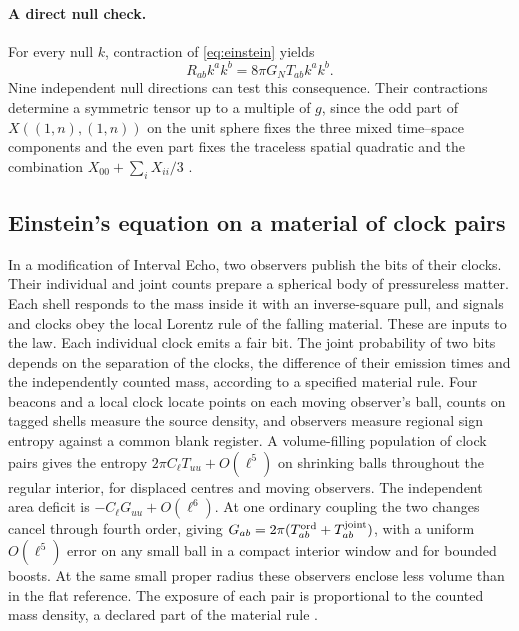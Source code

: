 \documentclass[11pt]{article}
\theoremstyle{definition}
\theoremstyle{remark}
\begin{document}
\paragraph{A direct null check.}
\label{thm:null-tomography}
For every null $k$, contraction of \eqref{eq:einstein} yields
\begin{equation}
 R_{ab}k^ak^b=8\pi G_N T_{ab}k^ak^b . \label{eq:null-balance}
\end{equation}
Nine independent null directions can test this consequence. Their
contractions determine a symmetric tensor up to a multiple of $g$, since
the odd part of $X((1,n),(1,n))$ on the unit sphere fixes the three mixed
time--space components and the even part fixes the traceless spatial
quadratic and the combination $X_{00}+\sum_i X_{ii}/3$ \cite{ophEinstein}.

\subsection{Einstein's equation on a material of clock pairs}
\label{sec:einstein-dust}

In a modification of Interval Echo, two observers publish the bits of
their clocks. Their individual and joint counts prepare a spherical body
of pressureless matter. Each shell responds to the mass inside it with
an inverse-square pull, and signals and clocks obey the local Lorentz
rule of the falling material. These are inputs to the law. Each
individual clock emits a fair bit. The joint probability of two bits
depends on the separation of the clocks, the difference of their
emission times and the independently counted mass, according to a
specified material rule. Four beacons and a local clock locate points on
each moving observer's ball, counts on tagged shells measure the source
density, and observers measure regional sign entropy against a common
blank register. A volume-filling population of clock pairs gives the
entropy $2\pi C_\ell T_{uu}+O(\ell^5)$ on shrinking balls throughout the
regular interior, for displaced centres and moving observers. The
independent area deficit is $-C_\ell G_{uu}+O(\ell^6)$. At one ordinary
coupling the two changes cancel through fourth order, giving
$G_{ab}=2\pi(T^{\rm ord}_{ab}+T^{\rm joint}_{ab})$, with a uniform
$O(\ell^5)$ error on any small ball in a compact interior window and for
bounded boosts. At the same small proper radius these observers enclose
less volume than in the flat reference. The exposure of each pair is
proportional to the counted mass density, a declared part of the
material rule \cite{ophEinstein}.
\end{document}
